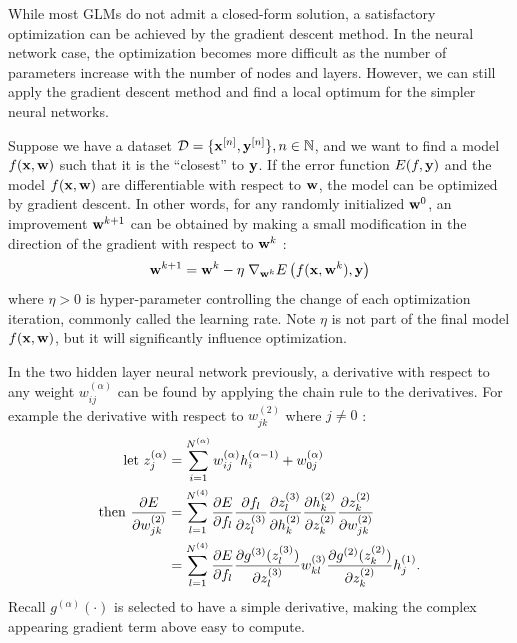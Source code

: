 \pagebreak 

While most GLMs do not admit a closed-form solution,
a satisfactory optimization can be achieved by the gradient descent method.
In the neural network case,
the optimization becomes more difficult as
the number of parameters increase with the number of nodes and layers.
However, we can still apply the gradient descent method
and find a local optimum for the simpler neural networks.

Suppose we have a dataset $\mathcal{D} = \{\mathbf{x}^{[n]}, 
\mathbf{y}^{[n]}\}, n \in \mathbb{N}$,
and we want to find a model $f(\mathbf{x},\mathbf{w})$ such that 
it is the ``closest'' to $\mathbf{y}$.
If the error function $E(f,\mathbf{y})$
and the model $f(\mathbf{x},\mathbf{w})$ are differentiable
with respect to $\mathbf{w}$,
the model can be optimized by gradient descent.
In other words, for any randomly initialized $\mathbf{w}^0$,
an improvement $\mathbf{w}^{k+1}$ can be obtained by making a 
small modification
in the direction of the gradient with respect to $\mathbf{w}^k$ :
%
\begin{equation}
	\mathbf{w}^{k+1} = \mathbf{w}^{k} - \eta \; \nabla_{\mathbf{w}^k} 
					E\left(f(\mathbf{x},\mathbf{w}^k),\mathbf{y}\right)
\end{equation}
%
where $\eta > 0$ is hyper-parameter controlling the change of 
each optimization iteration, commonly called the learning rate.
Note $\eta$ is not part of the final model $f(\mathbf{x},\mathbf{w})$,
but it will significantly influence optimization.

In the two hidden layer neural network previously,
a derivative with respect to any weight 
$w_{ij}^{(\alpha)}$ can be found
by applying the chain rule to the derivatives.
For example the derivative with respect to $w_{jk}^{(2)}$ 
where $j \neq 0$ :
%
\begin{equation}
\begin{aligned}
	\text{let } z_j^{(\alpha)} &= 
		\sum_{i=1}^{N^{(\alpha)}} w_{ij}^{(\alpha)} h_i^{(\alpha-1)}
      + w_{0j}^{(\alpha)} \\
	\text{then } \frac{\partial E}{\partial w_{jk}^{(2)}} &= 
		\sum_{l=1}^{N^{(4)}} \frac{\partial E}{\partial f_l}
		\frac{\partial f_l}{\partial z_l^{(3)}}
		\frac{\partial z_l^{(3)}}{\partial h_k^{(2)}}
		\frac{\partial h_k^{(2)}}{\partial z_k^{(2)}}
		\frac{\partial z_k^{(2)}}{\partial w_{jk}^{(2)}} \\
	&=
		\sum_{l=1}^{N^{(4)}} \frac{\partial E}{\partial f_l}
		\frac{\partial g^{(3)}(z_l^{(3)}) } {\partial z_l^{(3)}}
		w_{kl}^{(3)}
		\frac{\partial g^{(2)}(z_k^{(2)}) } {\partial z_k^{(2)}}
		h_j^{(1)} .
\end{aligned}
\end{equation}
%
Recall $g^{(\alpha)}(\cdot)$ is selected to have a simple derivative,
making the complex appearing gradient term above easy to compute.

